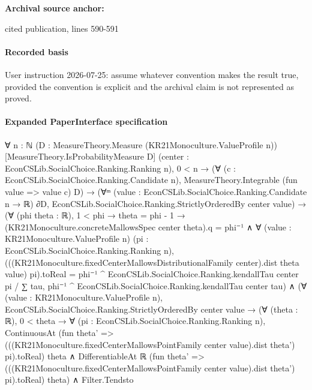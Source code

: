 \documentclass[10pt]{article}
\begin{document}
\textbf{Archival source anchor:} {\footnotesize\raggedright cited publication, lines 590-\allowbreak{}591\par}
\paragraph{Recorded basis}
User instruction 2026-\allowbreak{}07-\allowbreak{}25:\allowbreak{} assume whatever convention makes the result true, provided the convention is explicit and the archival claim is not represented as proved.\allowbreak{}
\paragraph{Expanded PaperInterface specification}
\begin{ReviewVerbatim}
∀ {n : ℕ} (D : MeasureTheory.Measure (KR21Monoculture.ValueProfile n)) [MeasureTheory.IsProbabilityMeasure D]
  (center : EconCSLib.SocialChoice.Ranking.Ranking n),
  0 < n →
    (∀ (c : EconCSLib.SocialChoice.Ranking.Candidate n), MeasureTheory.Integrable (fun value => value c) D) →
      (∀ᵐ (value : EconCSLib.SocialChoice.Ranking.Candidate n → ℝ) ∂D,
          EconCSLib.SocialChoice.Ranking.StrictlyOrderedBy center value) →
        (∀ (phi theta : ℝ),
            1 < phi →
              theta = phi - 1 →
                (KR21Monoculture.concreteMallowsSpec center theta).q = phi⁻¹ ∧
                  ∀ (value : KR21Monoculture.ValueProfile n) (pi : EconCSLib.SocialChoice.Ranking.Ranking n),
                    (((KR21Monoculture.fixedCenterMallowsDistributionalFamily center).dist theta value) pi).toReal =
                      phi⁻¹ ^ EconCSLib.SocialChoice.Ranking.kendallTau center pi /
                        ∑ tau, phi⁻¹ ^ EconCSLib.SocialChoice.Ranking.kendallTau center tau) ∧
          (∀ (value : KR21Monoculture.ValueProfile n),
              EconCSLib.SocialChoice.Ranking.StrictlyOrderedBy center value →
                (∀ (theta : ℝ),
                    0 < theta →
                      ∀ (pi : EconCSLib.SocialChoice.Ranking.Ranking n),
                        ContinuousAt
                            (fun theta' =>
                              (((KR21Monoculture.fixedCenterMallowsPointFamily center value).dist theta') pi).toReal)
                            theta ∧
                          DifferentiableAt ℝ
                            (fun theta' =>
                              (((KR21Monoculture.fixedCenterMallowsPointFamily center value).dist theta') pi).toReal)
                            theta) ∧
                  Filter.Tendsto

\end{ReviewVerbatim}
\end{document}
